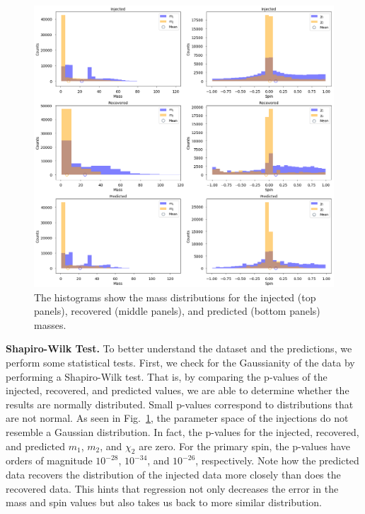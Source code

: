 \documentclass[aps,prd,twocolumn,superscriptaddress,preprintnumbers,floatfix,nofootinbib]{revtex4-2}
\begin{document}
\begin{figure}[t]
  \center
  \includegraphics[width=\linewidth]{m_chi_shapiro_test.png}
  \caption{The histograms show the mass distributions for the injected 
    (top panels), recovered (middle panels), and predicted (bottom panels) 
    masses.}
  \label{m_chi_shapiro_test}
\end{figure}

\textbf{Shapiro-Wilk Test.} To better understand the dataset and the predictions, we perform some 
statistical tests. First, we check for the Gaussianity of the data by performing a Shapiro-Wilk 
test. That is, by comparing the p-values of the injected, recovered, and predicted values, we are 
able to determine whether the results are normally distributed. Small p-values correspond to 
distributions that are not normal. As seen in Fig.~\ref{m_chi_shapiro_test},
the parameter space of the injections do not resemble a Gaussian distribution.
In fact, the p-values for the injected, recovered, and predicted $m_1$, $m_2$,
and $\chi_2$ are zero. For the primary spin, the p-values have orders of
magnitude $10^{-28}$, $10^{-34}$, and $10^{-26}$, respectively. Note how the
predicted data recovers the distribution of the injected data more closely than
does the recovered data. This hints that regression not only decreases the
error in the mass and spin values but also takes us back to more similar
distribution. 
\end{document}
